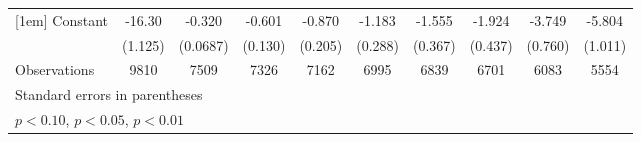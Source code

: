 \begin{table}[htbp]
\begin{tabular}{l*{9}{c}}
[1em]
Constant            &      -16.30\sym{***}&      -0.320\sym{***}&      -0.601\sym{***}&      -0.870\sym{***}&      -1.183\sym{***}&      -1.555\sym{***}&      -1.924\sym{***}&      -3.749\sym{***}&      -5.804\sym{***}\\
                    &     (1.125)         &    (0.0687)         &     (0.130)         &     (0.205)         &     (0.288)         &     (0.367)         &     (0.437)         &     (0.760)         &     (1.011)         \\
\hline
Observations        &        9810         &        7509         &        7326         &        7162         &        6995         &        6839         &        6701         &        6083         &        5554         \\
\hline\hline
\multicolumn{10}{l}{\footnotesize Standard errors in parentheses}\\
\multicolumn{10}{l}{\footnotesize \sym{*} \(p<0.10\), \sym{**} \(p<0.05\), \sym{***} \(p<0.01\)}\\
\end{tabular}
\end{table}
